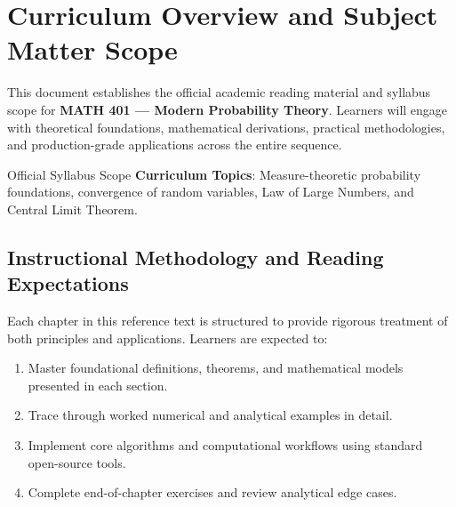 \section{Curriculum Overview and Subject Matter Scope}

This document establishes the official academic reading material and syllabus scope for \textbf{MATH 401 --- Modern Probability Theory}. Learners will engage with theoretical foundations, mathematical derivations, practical methodologies, and production-grade applications across the entire sequence.

\begin{InsightBox}{Official Syllabus Scope}
  \textbf{Curriculum Topics}: Measure-theoretic probability foundations, convergence of random variables, Law of Large Numbers, and Central Limit Theorem.
\end{InsightBox}

\subsection{Instructional Methodology and Reading Expectations}

Each chapter in this reference text is structured to provide rigorous treatment of both principles and applications. Learners are expected to:
\begin{enumerate}
  \item Master foundational definitions, theorems, and mathematical models presented in each section.
  \item Trace through worked numerical and analytical examples in detail.
  \item Implement core algorithms and computational workflows using standard open-source tools.
  \item Complete end-of-chapter exercises and review analytical edge cases.
\end{enumerate}

